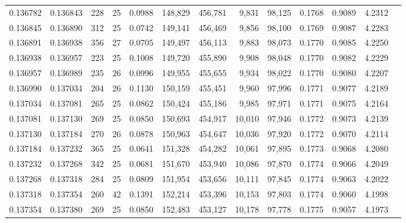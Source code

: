 \begin{tabular}{rrrrrrrrrrrrr}
0.136782 & 0.136843 & 228 &  25 &                                     0.0988 & 148,829 & 456,781 &   9,831 &  98,125 & 0.1768 & 0.9089 & 4.2312 \\
0.136845 & 0.136890 & 312 &  25 &                                     0.0742 & 149,141 & 456,469 &   9,856 &  98,100 & 0.1769 & 0.9087 & 4.2283 \\
0.136891 & 0.136938 & 356 &  27 &                                     0.0705 & 149,497 & 456,113 &   9,883 &  98,073 & 0.1770 & 0.9085 & 4.2250 \\
0.136938 & 0.136957 & 223 &  25 &                                     0.1008 & 149,720 & 455,890 &   9,908 &  98,048 & 0.1770 & 0.9082 & 4.2229 \\
0.136957 & 0.136989 & 235 &  26 &                                     0.0996 & 149,955 & 455,655 &   9,934 &  98,022 & 0.1770 & 0.9080 & 4.2207 \\
0.136990 & 0.137034 & 204 &  26 &                                     0.1130 & 150,159 & 455,451 &   9,960 &  97,996 & 0.1771 & 0.9077 & 4.2189 \\
0.137034 & 0.137081 & 265 &  25 &                                     0.0862 & 150,424 & 455,186 &   9,985 &  97,971 & 0.1771 & 0.9075 & 4.2164 \\
0.137081 & 0.137130 & 269 &  25 &                                     0.0850 & 150,693 & 454,917 &  10,010 &  97,946 & 0.1772 & 0.9073 & 4.2139 \\
0.137130 & 0.137184 & 270 &  26 &                                     0.0878 & 150,963 & 454,647 &  10,036 &  97,920 & 0.1772 & 0.9070 & 4.2114 \\
0.137184 & 0.137232 & 365 &  25 &                                     0.0641 & 151,328 & 454,282 &  10,061 &  97,895 & 0.1773 & 0.9068 & 4.2080 \\
0.137232 & 0.137268 & 342 &  25 &                                     0.0681 & 151,670 & 453,940 &  10,086 &  97,870 & 0.1774 & 0.9066 & 4.2049 \\
0.137268 & 0.137318 & 284 &  25 &                                     0.0809 & 151,954 & 453,656 &  10,111 &  97,845 & 0.1774 & 0.9063 & 4.2022 \\
0.137318 & 0.137354 & 260 &  42 &                                     0.1391 & 152,214 & 453,396 &  10,153 &  97,803 & 0.1774 & 0.9060 & 4.1998 \\
0.137354 & 0.137380 & 269 &  25 &                                     0.0850 & 152,483 & 453,127 &  10,178 &  97,778 & 0.1775 & 0.9057 & 4.1973 \\

\end{tabular}
